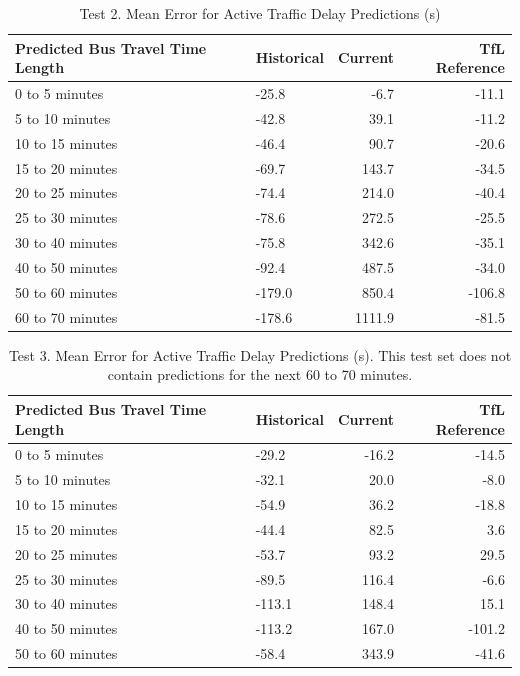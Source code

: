 \begin{table}
\centering
\begin{tabular}{@{}llrr@{}} \toprule
 Predicted Bus Travel Time Length      & Historical & Current & TfL Reference \\ \midrule
0 to 5 minutes   &   -25.8    &   -6.7  &     -11.1     \\
5 to 10 minutes  &   -42.8    &   39.1  &     -11.2     \\
10 to 15 minutes &   -46.4    &   90.7  &     -20.6     \\
15 to 20 minutes &   -69.7    &  143.7  &     -34.5     \\
20 to 25 minutes &   -74.4    &  214.0  &     -40.4     \\
25 to 30 minutes &   -78.6    &  272.5  &     -25.5     \\
30 to 40 minutes &   -75.8    &  342.6  &     -35.1     \\
40 to 50 minutes &   -92.4    &  487.5  &     -34.0     \\
50 to 60 minutes &   -179.0   &  850.4  &     -106.8    \\
60 to 70 minutes &   -178.6   &  1111.9 &     -81.5     \\
\bottomrule
\end{tabular}
\caption{Test 2. Mean Error for Active Traffic Delay Predictions (s)}
\label{table:test2_mean_error}
\end{table}

\begin{table}
\centering
\begin{tabular}{@{}llrr@{}} \toprule
 Predicted Bus Travel Time Length   & Historical & Current & TfL Reference \\ \midrule
0 to 5 minutes   &   -29.2    &  -16.2  &     -14.5  \\
5 to 10 minutes  &   -32.1    &   20.0  &      -8.0  \\
10 to 15 minutes &   -54.9    &   36.2  &     -18.8  \\
15 to 20 minutes &   -44.4    &   82.5  &      3.6   \\
20 to 25 minutes &   -53.7    &   93.2  &      29.5  \\
25 to 30 minutes &   -89.5    &  116.4  &      -6.6  \\
30 to 40 minutes &   -113.1   &  148.4  &      15.1  \\
40 to 50 minutes &   -113.2   &  167.0  &     -101.2 \\
50 to 60 minutes &   -58.4    &  343.9  &     -41.6  \\
\bottomrule
\end{tabular}
\caption{Test 3. Mean Error for Active Traffic Delay Predictions (s).
This test set does not contain predictions for the next 60 to 70 minutes.}
\label{table:test3_mean_error}
\end{table}

